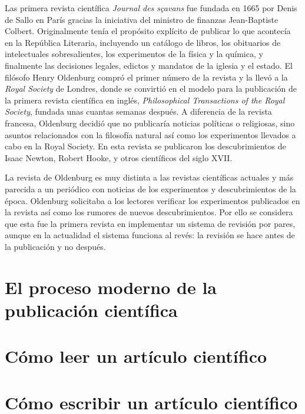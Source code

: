 Las primera revista científica \emph{Journal des sçavans} fue fundada en 1665
por Denis de Sallo en París gracias la iniciativa del ministro de finanzas
Jean-Baptiste Colbert.
Originalmente tenía el propósito explícito de publicar lo que acontecía en la
República Literaria, incluyendo un catálogo de libros, los obituarios de
intelectuales sobresalientes, los experimentos de la física y la química, y
finalmente las decisiones legales, edictos y mandatos de la iglesia y el
estado\cite{Fyfe2022-ca}.
El filósofo Henry Oldenburg compró el primer número de la revista y la llevó a
la \emph{Royal Society} de Londres, donde se convirtió en el modelo para la
publicación de la primera revista científica en inglés, \emph{Philosophical
    Transactions of the Royal Society}, fundada unas cuantas semanas después.
A diferencia de la revista francesa, Oldenburg decidió que no publicaría
noticias políticas o religiosas, sino asuntos relacionados con la filosofía
natural así como los experimentos llevados a cabo en la Royal Society.
En esta revista se publicaron los descubrimientos de Isaac Newton, Robert Hooke,
y otros científicos del siglo XVII.

La revista de Oldenburg es muy distinta a las revistas científicas actuales y
más parecida a un periódico con noticias de los experimentos y descubrimientos
de la época.
Oldenburg solicitaba a los lectores verificar los experimentos publicados en la
revista así como los rumores de nuevos descubrimientos.
Por ello se considera que esta fue la primera revista en implementar un sistema
de revisión por pares, aunque en la actualidad el sistema funciona al revés: la
revisión se hace antes de la publicación y no después.

\section{El proceso moderno de la publicación científica}
\label{sec:procesopublicacion}

\section{Cómo leer un artículo científico}
\label{sec:comoleer}

\section{Cómo escribir un artículo científico}
\label{sec:comoescribir}